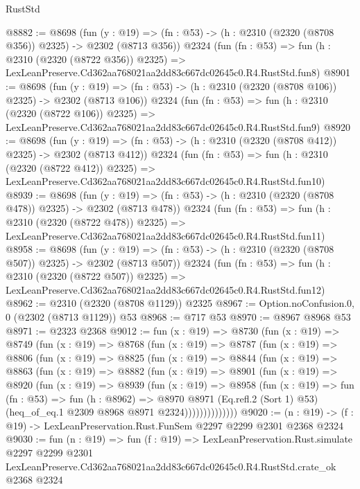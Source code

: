 \begin{lexlean}{RustStd}
\begin{coremodule}
@8882 := @8698
    (fun (y : @19) => (fn : @53) -> (h : @2310 (@2320 (@8708 @356)) @2325) -> @2302 (@8713 @356))
    @2324
    (fun (fn : @53) =>
    fun (h : @2310 (@2320 (@8722 @356)) @2325) =>
    LexLeanPreserve.Cd362aa768021aa2dd83c667dc02645c0.R4.RustStd.fun8)
@8901 := @8698
    (fun (y : @19) => (fn : @53) -> (h : @2310 (@2320 (@8708 @106)) @2325) -> @2302 (@8713 @106))
    @2324
    (fun (fn : @53) =>
    fun (h : @2310 (@2320 (@8722 @106)) @2325) =>
    LexLeanPreserve.Cd362aa768021aa2dd83c667dc02645c0.R4.RustStd.fun9)
@8920 := @8698
    (fun (y : @19) => (fn : @53) -> (h : @2310 (@2320 (@8708 @412)) @2325) -> @2302 (@8713 @412))
    @2324
    (fun (fn : @53) =>
    fun (h : @2310 (@2320 (@8722 @412)) @2325) =>
    LexLeanPreserve.Cd362aa768021aa2dd83c667dc02645c0.R4.RustStd.fun10)
@8939 := @8698
    (fun (y : @19) => (fn : @53) -> (h : @2310 (@2320 (@8708 @478)) @2325) -> @2302 (@8713 @478))
    @2324
    (fun (fn : @53) =>
    fun (h : @2310 (@2320 (@8722 @478)) @2325) =>
    LexLeanPreserve.Cd362aa768021aa2dd83c667dc02645c0.R4.RustStd.fun11)
@8958 := @8698
    (fun (y : @19) => (fn : @53) -> (h : @2310 (@2320 (@8708 @507)) @2325) -> @2302 (@8713 @507))
    @2324
    (fun (fn : @53) =>
    fun (h : @2310 (@2320 (@8722 @507)) @2325) =>
    LexLeanPreserve.Cd362aa768021aa2dd83c667dc02645c0.R4.RustStd.fun12)
@8962 := @2310 (@2320 (@8708 @1129)) @2325
@8967 := Option.noConfusion.{0, 0} (@2302 (@8713 @1129)) @53
@8968 := @717 @53
@8970 := @8967 @8968 @53
@8971 := @2323 @2368
@9012 := fun (x : @19) =>
  @8730
    (fun (x : @19) =>
    @8749
      (fun (x : @19) =>
      @8768
        (fun (x : @19) =>
        @8787
          (fun (x : @19) =>
          @8806
            (fun (x : @19) =>
            @8825
              (fun (x : @19) =>
              @8844
                (fun (x : @19) =>
                @8863
                  (fun (x : @19) =>
                  @8882
                    (fun (x : @19) =>
                    @8901
                      (fun (x : @19) =>
                      @8920
                        (fun (x : @19) =>
                        @8939
                          (fun (x : @19) =>
                          @8958
                            (fun (x : @19) =>
                            fun (fn : @53) =>
                            fun (h : @8962) =>
                            @8970
                              @8971
                              (Eq.refl.{2} (Sort 1) @53)
                              (heq_of_eq.{1} @2309 @8968 @8971 @2324))))))))))))))
@9020 := (n : @19) -> (f : @19) -> LexLeanPreservation.Rust.FunSem @2297 @2299 @2301 @2368 @2324
@9030 := fun (n : @19) =>
  fun (f : @19) =>
  LexLeanPreservation.Rust.simulate
    @2297
    @2299
    @2301
    LexLeanPreserve.Cd362aa768021aa2dd83c667dc02645c0.R4.RustStd.crate_ok
    @2368
    @2324
\end{coremodule}
\end{lexlean}
